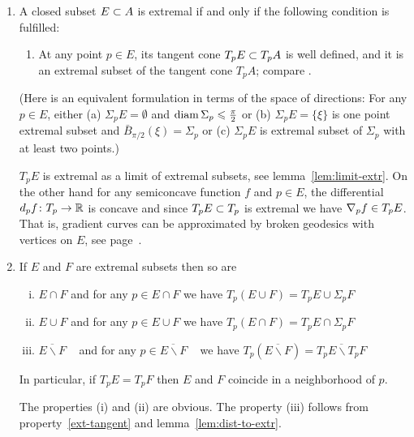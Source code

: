 \documentclass{article}
\begin{document}
\begin{enumerate}\setcounter{enumi}{\value{extr-prop}}

\item\label{ext-tangent} A closed subset $E\subset A$ is  extremal if and only if 
the following condition is fulfilled:
\begin{enumerate}[$\diamond$]
\item At any point $p\in E$, its tangent cone $T_p E\subset T_p A$ is well defined,
and it is an extremal subset of the tangent cone $T_p A$; compare
\cite[1.4]{perelman-petrunin:extremal}.
\end{enumerate}

(Here is an
equivalent formulation in terms of the space of directions: For any $p\in E$,
either 
(a) $\Sigma_p E=\emptyset$ and $\operatorname{diam} \Sigma_p\leqslant\tfrac\pi2$ or 
(b) $\Sigma_p E=\{\xi\}$ is one point extremal subset and $\bar B_{\pi/2}(\xi)=\Sigma_p$
or
(c) $\Sigma_p E$ is extremal subset of $\Sigma_p$ with at least two points.)


$T_p E$ is extremal as a limit of extremal subsets, see
lemma~\ref{lem:limit-extr}. 
On the other hand for any semiconcave function $f$ and $p\in E$, the differential $d_p f\colon T_p\to\mathbb{R}$ is concave and since $T_p E\subset T_p$ is extremal we have $\nabla_p f\z\in T_p E$. 
That is, 
gradient curves can be approximated by broken
geodesics with vertices on $E$, see page~\pageref{grad-constr}.

\item \cite[3.4--5]{perelman-petrunin:extremal} If $E$ and $F$ are extremal subsets then so are
\begin{enumerate}[(i)]
\item $E\cap F$ and for any $p\in E\cap F$ we have $T_p(E\cup F)=T_p E\cup \Sigma_p F$
\item $E\cup F$ and  for any $p\in E\cup F$ we have $T_p(E\cap F)=T_p E\cap \Sigma_p F$
\item \label{E-F}$\overline{E\backslash F}$\ \,\, and for any $p\in \overline{E\backslash F}$\ \,\, we have $T_p(\overline{E\backslash
F})=\overline{T_p E\backslash T_p F}$
\end{enumerate}
In particular, if $T_p E=T_p F$ then $E$ and $F$ coincide in a neighborhood of $p$.

The properties (i) and (ii) are obvious. 
The property (iii) follows from
property~\ref{ext-tangent} and lemma~\ref{lem:dist-to-extr}.
\setcounter{extr-prop}{\value{enumi}}
\end{enumerate}
\end{document}
